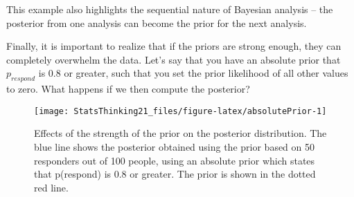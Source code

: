 \documentclass[]{book}
\newenvironment{Shaded}{\begin{snugshade}}{\end{snugshade}}
\newcommand{\KeywordTok}[1]{\textcolor[rgb]{0.13,0.29,0.53}{\textbf{#1}}}
\newcommand{\DataTypeTok}[1]{\textcolor[rgb]{0.13,0.29,0.53}{#1}}
\newcommand{\DecValTok}[1]{\textcolor[rgb]{0.00,0.00,0.81}{#1}}
\newcommand{\FloatTok}[1]{\textcolor[rgb]{0.00,0.00,0.81}{#1}}
\newcommand{\StringTok}[1]{\textcolor[rgb]{0.31,0.60,0.02}{#1}}
\newcommand{\CommentTok}[1]{\textcolor[rgb]{0.56,0.35,0.01}{\textit{#1}}}
\newcommand{\OperatorTok}[1]{\textcolor[rgb]{0.81,0.36,0.00}{\textbf{#1}}}
\newcommand{\NormalTok}[1]{#1}
\theoremstyle{definition}
\theoremstyle{definition}
\theoremstyle{definition}
\theoremstyle{remark}
\begin{document}
This example also highlights the sequential nature of Bayesian analysis
-- the posterior from one analysis can become the prior for the next
analysis.

Finally, it is important to realize that if the priors are strong
enough, they can completely overwhelm the data. Let's say that you have
an absolute prior that \(p_{respond}\) is 0.8 or greater, such that you
set the prior likelihood of all other values to zero. What happens if we
then compute the posterior?

\begin{Shaded}
\end{Shaded}

\begin{figure}
\texttt{[image: StatsThinking21\_files/figure-latex/absolutePrior-1]} \caption{Effects of the strength of the prior on the posterior distribution. The blue line shows the posterior obtained using the prior based on 50 responders out of 100 people, using an absolute prior which states that p(respond) is 0.8 or greater.  The prior is shown in the dotted red line. }\label{fig:absolutePrior}
\end{figure}
\end{document}
